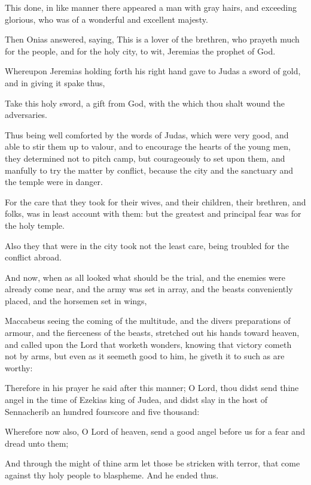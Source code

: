 {\par }{\PP {}This done, in like manner there appeared a man with gray hairs, and exceeding glorious, who was of a wonderful and excellent majesty.
\par }{\PP {}Then Onias answered, saying, This is a lover of the brethren, who prayeth much for the people, and for the holy city, to wit, Jeremias the prophet of God.
\par }{\PP {}Whereupon Jeremias holding forth his right hand gave to Judas a sword of gold, and in giving it spake thus,
\par }{\PP {}Take this holy sword, a gift from God, with the which thou shalt wound the adversaries.
\par }{\PP {}Thus being well comforted by the words of Judas, which were very good, and able to stir them up to valour, and to encourage the hearts of the young men, they determined not to pitch camp, but courageously to set upon them, and manfully to try the matter by conflict, because the city and the sanctuary and the temple were in danger.
\par }{\PP {}For the care that they took for their wives, and their children, their brethren, and folks, was in least account with them: but the greatest and principal fear was for the holy temple.
\par }{\PP {}Also they that were in the city took not the least care, being troubled for the conflict abroad.
\par }{\PP {}And now, when as all looked what should be the trial, and the enemies were already come near, and the army was set in array, and the beasts conveniently placed, and the horsemen set in wings,
\par }{\PP {}Maccabeus seeing the coming of the multitude, and the divers preparations of armour, and the fierceness of the beasts, stretched out his hands toward heaven, and called upon the Lord that worketh wonders, knowing that victory cometh not by arms, but even as it seemeth good to him, he giveth it to such as are worthy:
\par }{\PP {}Therefore in his prayer he said after this manner; O Lord, thou didst send thine angel in the time of Ezekias king of Judea, and didst slay in the host of Sennacherib an hundred fourscore and five thousand:
\par }{\PP {}Wherefore now also, O Lord of heaven, send a good angel before us for a fear and dread unto them;
\par }{\PP {}And through the might of thine arm let those be stricken with terror, that come against thy holy people to blaspheme. And he ended thus.
}

